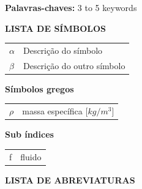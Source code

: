\documentclass[a4paper,12pt,oneside]{article}
\numberwithin{equation}{section}
\begin{document}
\vspace*{1cm}
\textbf{Palavras-chaves:} 3 to 5 keywords



\newpage
\thispagestyle{empty}
\renewcommand\contentsname{\centering\Large ÍNDICE}
\tableofcontents



\newpage
\thispagestyle{empty}
\listoffigures



\newpage
\thispagestyle{empty}
\listoftables

\newpage
\thispagestyle{empty}
\begin{center}
	\textbf{\Large{LISTA DE SÍMBOLOS}}
\end{center}


\begin{changemargin}{1.5cm}{1.5cm} 
	\begin{tabular}{ll}
		$\alpha$ 	&	Descrição do símbolo\\
		$\beta$ 	&	Descrição do outro símbolo\\
	\end{tabular}
\end{changemargin}

\textbf{Símbolos gregos}
\begin{changemargin}{1.5cm}{1.5cm} 
	\begin{tabular}{ll}
		$\rho$ 	&	massa específica [$kg/m^{3}$]\\
		
	\end{tabular}
\end{changemargin}

\textbf{Sub índices}
\begin{changemargin}{1.5cm}{1.5cm} 
	\begin{tabular}{ll}
		f 	&	fluido\\
		
	\end{tabular}
\end{changemargin}



\newpage
\thispagestyle{empty}
\begin{center}
	\textbf{\Large{LISTA DE ABREVIATURAS}}
\end{center}
\end{document}
